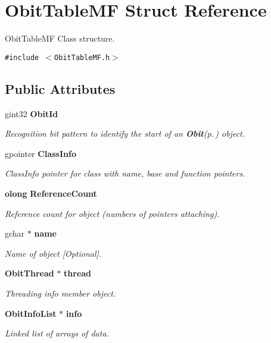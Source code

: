 \section{Obit\-Table\-MF Struct Reference}
\label{structObitTableMF}
Obit\-Table\-MF Class structure.  


{\tt \#include $<$Obit\-Table\-MF.h$>$}

\subsection*{Public Attributes}
\begin{CompactItemize}
\item 
gint32 {\bf Obit\-Id}
\begin{CompactList}\small\item\em Recognition bit pattern to identify the start of an {\bf Obit}{\rm (p.\,\pageref{structObit})} object. \item\end{CompactList}\item 
gpointer {\bf Class\-Info}
\begin{CompactList}\small\item\em Class\-Info pointer for class with name, base and function pointers. \item\end{CompactList}\item 
{\bf olong} {\bf Reference\-Count}
\begin{CompactList}\small\item\em Reference count for object (numbers of pointers attaching). \item\end{CompactList}\item 
gchar $\ast$ {\bf name}
\begin{CompactList}\small\item\em Name of object [Optional]. \item\end{CompactList}\item 
{\bf Obit\-Thread} $\ast$ {\bf thread}
\begin{CompactList}\small\item\em Threading info member object. \item\end{CompactList}\item 
{\bf Obit\-Info\-List} $\ast$ {\bf info}
\begin{CompactList}\small\item\em Linked list of arrays of data. \item\end{CompactList}\item 

\end{CompactItemize}
